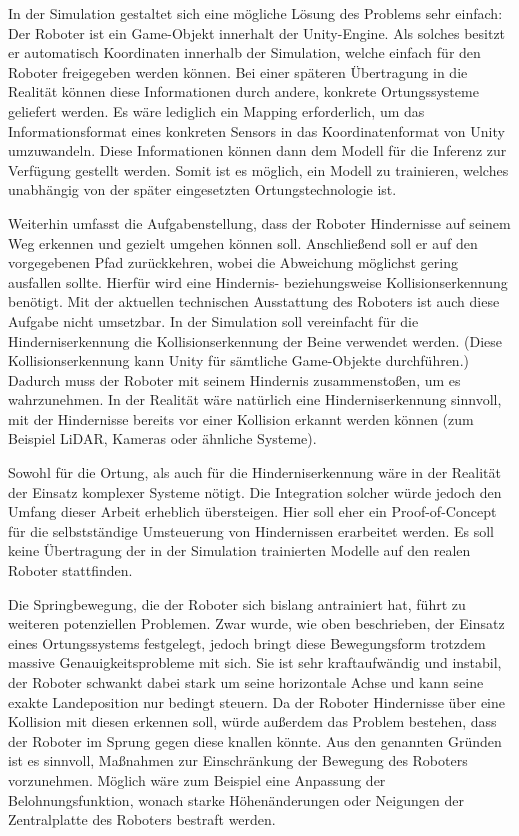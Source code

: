 In der Simulation gestaltet sich eine mögliche Lösung des Problems sehr einfach: Der Roboter ist ein Game-Objekt innerhalt der Unity-Engine.
Als solches besitzt er automatisch Koordinaten innerhalb der Simulation, welche einfach für den Roboter freigegeben werden können.
Bei einer späteren Übertragung in die Realität können diese Informationen durch andere, konkrete Ortungssysteme geliefert werden.
Es wäre lediglich ein Mapping erforderlich, um das Informationsformat eines konkreten Sensors in das Koordinatenformat von Unity umzuwandeln.
Diese Informationen können dann dem Modell für die Inferenz zur Verfügung gestellt werden.
Somit ist es möglich, ein Modell zu trainieren, welches unabhängig von der später eingesetzten Ortungstechnologie ist.

Weiterhin umfasst die Aufgabenstellung, dass der Roboter Hindernisse auf seinem Weg erkennen und gezielt umgehen können soll.
Anschließend soll er auf den vorgegebenen Pfad zurückkehren, wobei die Abweichung möglichst gering ausfallen sollte.
Hierfür wird eine Hindernis- beziehungsweise Kollisionserkennung benötigt.
Mit der aktuellen technischen Ausstattung des Roboters ist auch diese Aufgabe nicht umsetzbar.
In der Simulation soll vereinfacht für die Hinderniserkennung die Kollisionserkennung der Beine verwendet werden.
(Diese Kollisionserkennung kann Unity für sämtliche Game-Objekte durchführen.)
Dadurch muss der Roboter mit seinem Hindernis zusammenstoßen, um es wahrzunehmen.
In der Realität wäre natürlich eine Hinderniserkennung sinnvoll, mit der Hindernisse bereits vor einer Kollision erkannt werden können (zum Beispiel LiDAR, Kameras oder ähnliche Systeme).

Sowohl für die Ortung, als auch für die Hinderniserkennung wäre in der Realität der Einsatz komplexer Systeme nötigt.
Die Integration solcher würde jedoch den Umfang dieser Arbeit erheblich übersteigen.
Hier soll eher ein Proof-of-Concept für die selbstständige Umsteuerung von Hindernissen erarbeitet werden.
Es soll keine Übertragung der in der Simulation trainierten Modelle auf den realen Roboter stattfinden.

Die Springbewegung, die der Roboter sich bislang antrainiert hat, führt zu weiteren potenziellen Problemen.
Zwar wurde, wie oben beschrieben, der Einsatz eines Ortungssystems festgelegt, jedoch bringt diese Bewegungsform trotzdem massive Genauigkeitsprobleme mit sich. 
Sie ist sehr kraftaufwändig und instabil, der Roboter schwankt dabei stark um seine horizontale Achse und kann seine exakte Landeposition nur bedingt steuern.
Da der Roboter Hindernisse über eine Kollision mit diesen erkennen soll, würde außerdem das Problem bestehen, dass der Roboter im Sprung gegen diese knallen könnte.
Aus den genannten Gründen ist es sinnvoll, Maßnahmen zur Einschränkung der Bewegung des Roboters vorzunehmen.
Möglich wäre zum Beispiel eine Anpassung der Belohnungsfunktion, wonach starke Höhenänderungen oder Neigungen der Zentralplatte des Roboters bestraft werden.

